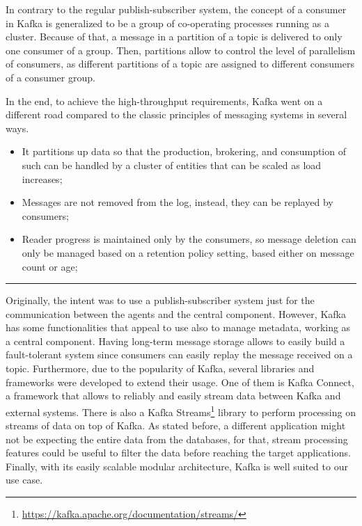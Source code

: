 In contrary to the regular publish-subscriber system, the concept of a consumer in Kafka is generalized to be a group of co-operating processes running as a cluster.
Because of that, a message in a partition of a topic is delivered to only one consumer of a group.
Then, partitions allow to control the level of parallelism of consumers, as different partitions of a topic are assigned to different consumers of a consumer group.

In the end, to achieve the high-throughput requirements, Kafka went on a different road compared to the classic principles of messaging systems in several ways.

\begin{itemize}
    \item It partitions up data so that the production, brokering, and consumption of such can be handled by a cluster of entities that can be scaled as load increases;
    \item Messages are not removed from the log, instead, they can be replayed by consumers;
    \item Reader progress is maintained only by the consumers, so message deletion can only be managed based on a retention policy setting, based either on message count or age;
\end{itemize}

\par\noindent\hfil\rule{.6\textwidth}{0.4pt}\hfil

Originally, the intent was to use a publish-subscriber system just for the communication between the agents and the central component.
However, Kafka has some functionalities that appeal to use also to manage metadata, working as a central component.
Having long-term message storage allows to easily build a fault-tolerant system since consumers can easily replay the message received on a topic.
Furthermore, due to the popularity of Kafka, several libraries and frameworks were developed to extend their usage.
One of them is Kafka Connect, a framework that allows to reliably and easily stream data between Kafka and external systems.
There is also a Kafka Streams\footnote{\url{https://kafka.apache.org/documentation/streams/}} library to perform processing on streams of data on top of Kafka.
As stated before, a different application might not be expecting the entire data from the databases, for that, stream processing features could be useful to filter the data before reaching the target applications.
Finally, with its easily scalable modular architecture, Kafka is well suited to our use case.

